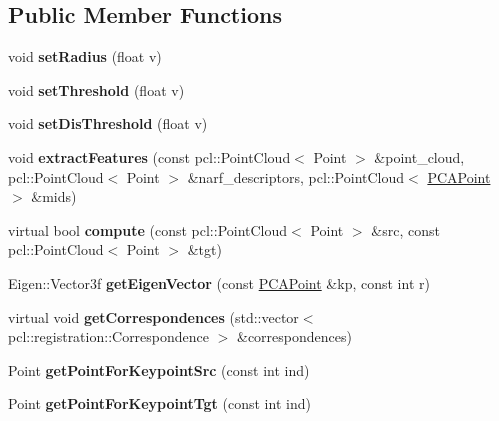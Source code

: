 \subsection*{Public Member Functions}
\begin{DoxyCompactItemize}
\item 
\hypertarget{classKeypoints__Segments_a4a5848b4e8cb7ded8056130798a68011}{
void {\bfseries setRadius} (float v)}
\label{classKeypoints__Segments_a4a5848b4e8cb7ded8056130798a68011}

\item 
\hypertarget{classKeypoints__Segments_afd15072c515fb668f82b887c564410bc}{
void {\bfseries setThreshold} (float v)}
\label{classKeypoints__Segments_afd15072c515fb668f82b887c564410bc}

\item 
\hypertarget{classKeypoints__Segments_a8456c0ef1b107b2cbce5ff3dc63b1926}{
void {\bfseries setDisThreshold} (float v)}
\label{classKeypoints__Segments_a8456c0ef1b107b2cbce5ff3dc63b1926}

\item 
\hypertarget{classKeypoints__Segments_a84427d6a4b94c5fcdeebc1f14ae53227}{
void {\bfseries extractFeatures} (const pcl::PointCloud$<$ Point $>$ \&point\_\-cloud, pcl::PointCloud$<$ Point $>$ \&narf\_\-descriptors, pcl::PointCloud$<$ \hyperlink{structPCAPoint}{PCAPoint} $>$ \&mids)}
\label{classKeypoints__Segments_a84427d6a4b94c5fcdeebc1f14ae53227}

\item 
\hypertarget{classKeypoints__Segments_a93746641a16bec472dd21ae02a3c279b}{
virtual bool {\bfseries compute} (const pcl::PointCloud$<$ Point $>$ \&src, const pcl::PointCloud$<$ Point $>$ \&tgt)}
\label{classKeypoints__Segments_a93746641a16bec472dd21ae02a3c279b}

\item 
\hypertarget{classKeypoints__Segments_aa162def5500ef9db0112b5426a7420d1}{
Eigen::Vector3f {\bfseries getEigenVector} (const \hyperlink{structPCAPoint}{PCAPoint} \&kp, const int r)}
\label{classKeypoints__Segments_aa162def5500ef9db0112b5426a7420d1}

\item 
\hypertarget{classKeypoints__Segments_ac28992ecca657130dc877b04e40a3db9}{
virtual void {\bfseries getCorrespondences} (std::vector$<$ pcl::registration::Correspondence $>$ \&correspondences)}
\label{classKeypoints__Segments_ac28992ecca657130dc877b04e40a3db9}

\item 
\hypertarget{classKeypoints__Segments_a04602e5c60d1effaac776a871b52f5ab}{
Point {\bfseries getPointForKeypointSrc} (const int ind)}
\label{classKeypoints__Segments_a04602e5c60d1effaac776a871b52f5ab}

\item 
\hypertarget{classKeypoints__Segments_abbc359c694633f0b3cab4695231801cb}{
Point {\bfseries getPointForKeypointTgt} (const int ind)}
\label{classKeypoints__Segments_abbc359c694633f0b3cab4695231801cb}

\end{DoxyCompactItemize}
